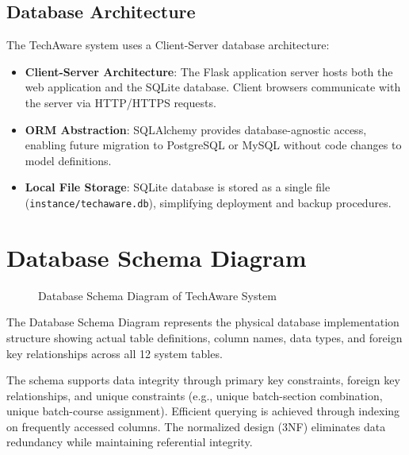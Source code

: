 \subsection{Database Architecture}

The TechAware system uses a Client-Server database architecture:

\begin{itemize}
    \item \textbf{Client-Server Architecture}: The Flask application server hosts both the web application and the SQLite database. Client browsers communicate with the server via HTTP/HTTPS requests.
    \item \textbf{ORM Abstraction}: SQLAlchemy provides database-agnostic access, enabling future migration to PostgreSQL or MySQL without code changes to model definitions.
    \item \textbf{Local File Storage}: SQLite database is stored as a single file (\texttt{instance/techaware.db}), simplifying deployment and backup procedures.
\end{itemize}

\section{Database Schema Diagram}

\begin{figure}[H]
\centering
{}
\caption{Database Schema Diagram of TechAware System}
\label{fig:dbschema}
\end{figure}

The Database Schema Diagram represents the physical database implementation structure showing actual table definitions, column names, data types, and foreign key relationships across all 12 system tables.

The schema supports data integrity through primary key constraints, foreign key relationships, and unique constraints (e.g., unique batch-section combination, unique batch-course assignment). Efficient querying is achieved through indexing on frequently accessed columns. The normalized design (3NF) eliminates data redundancy while maintaining referential integrity.

